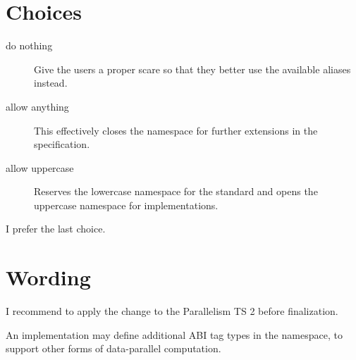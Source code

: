 \section{Choices}
\begin{description}
  \item[do nothing] Give the users a proper scare so that they better use the available aliases instead.
    \label{choice1}

  \item[allow anything] This effectively closes the  namespace for further extensions in the specification.
    \label{choice2}

  \item[allow uppercase] Reserves the lowercase namespace for the standard and opens the uppercase namespace for implementations.
    \label{choice3}
\end{description}

I prefer the last choice.

\section{Wording}
I recommend to apply the change to the Parallelism TS 2 before finalization.
\begin{wgText}[modify §8.2.1 p5]
  \setcounter{Paras}{4}
  \pnum
  An implementation may define additional ABI tag types in the  namespace, to support other forms of data-parallel computation.
\end{wgText}



